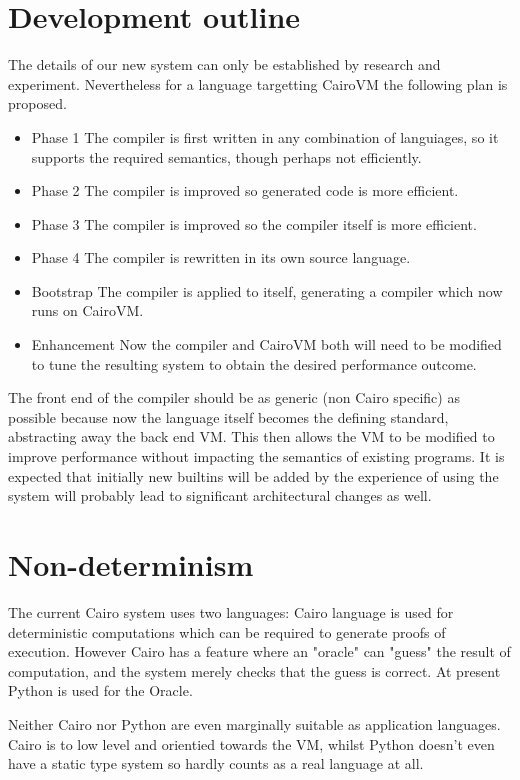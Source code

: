 \documentclass[oneside]{book}
\theoremstyle{plain}
\theoremstyle{definition}
\theoremstyle{plain}
\begin{document}
\section{Development outline}
The details of our new system can only be established by research and experiment.
Nevertheless for a language targetting CairoVM the following plan is proposed.
\begin{itemize}
\item{Phase 1} The compiler is first written in any combination of languiages, so it supports
the required semantics, though perhaps not efficiently.
\item{Phase 2} The compiler is improved so generated code is more efficient.
\item{Phase 3} The compiler is improved so the compiler itself is more efficient.
\item{Phase 4} The compiler is rewritten in its own source language.
\item{Bootstrap} The compiler is applied to itself, generating a compiler which now
runs on CairoVM.
\item{Enhancement} Now the compiler and CairoVM both will need to be modified to
tune the resulting system to obtain the desired performance outcome.
\end{itemize}

The front end of the compiler should be as generic (non Cairo specific) as possible
because now the language itself becomes the defining standard, abstracting away
the back end VM. This then allows the VM to be modified to improve performance
without impacting the semantics of existing programs. It is expected that initially
new builtins will be added by the experience of using the system will probably lead
to significant architectural changes as well.

\section{Non-determinism}
The current Cairo system uses two languages: Cairo language is used for deterministic
computations which can be required to generate proofs of execution. However Cairo
has a feature where an "oracle" can "guess" the result of computation, and the system
merely checks that the guess is correct. At present Python is used for the Oracle.

Neither Cairo nor Python are even marginally suitable as application languages.
Cairo is to low level and orientied towards the VM, whilst Python doesn't
even have a static type system so hardly counts as a real language at all.
\end{document}
